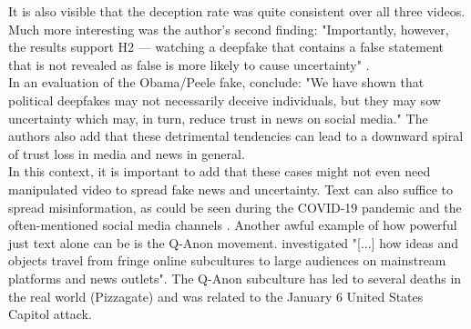 \documentclass[
  a4paper,  %
  twoside,  %
  bibliography=totoc,
  headsepline,
  cleardoublepage=empty,
  parskip=half,
  draft=false
]{scrbook}
\begin{document}
It is also visible that the deception rate was quite consistent over all three videos. Much more interesting was the author's second finding: "Importantly, however, the results support H2 — watching a deepfake that contains a false statement that is not revealed as false is more likely to cause uncertainty" \cite{vaccariDeepfakesDisinformationExploring2020}. \\
In an evaluation of the Obama/Peele fake, \citet{vaccariDeepfakesDisinformationExploring2020} conclude: "We have shown that political deepfakes may not necessarily deceive individuals, but they may sow uncertainty which may, in turn, reduce trust in news on social media." The authors also add that these detrimental tendencies can lead to a downward spiral of trust loss in media and news in general. \\
In this context, it is important to add that these cases might not even need manipulated video to spread fake news and uncertainty. Text can also suffice to spread misinformation, as could be seen during the COVID-19 pandemic and the often-mentioned social media channels \cite{naeemExplorationHowFake2021}. Another awful example of how powerful just text alone can be is the Q-Anon movement. \citet{zeeuwTracingNormieficationCrossplatform2020} investigated "[...] how ideas and objects travel from fringe online subcultures to large audiences on mainstream platforms and news outlets". The Q-Anon subculture has led to several deaths in the real world (Pizzagate) and was related to the January 6 United States Capitol attack.
\end{document}
